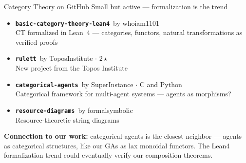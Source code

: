 \documentclass[aspectratio=169,14pt]{beamer}
\newcommand{\repo}[2]{\texttt{\color{geccoAccent}\bfseries #1}{\color{dimGray}\scriptsize\ by #2}}
\newcommand{\repoHL}[2]{\texttt{\color{geccoHighlight}\bfseries #1}{\color{dimGray}\scriptsize\ by #2}}
\newcommand{\repoGR}[2]{\texttt{\color{geccoGreen}\bfseries #1}{\color{dimGray}\scriptsize\ by #2}}
\newcommand{\bscore}[1]{{\color{geccoAccent}\bfseries #1}}
\newcommand{\connection}[1]{%
  \vspace{4pt}
  {\small\color{geccoHighlight}\textbf{Connection to our work:} \color{white}#1}}
\begin{document}
\begin{frame}{Category Theory on GitHub}
  {\small\color{dimGray} Small but active --- formalization is the trend}
  \vspace{6pt}

  \begin{itemize}
    \item[\bscore{0.20}] \repo{basic-category-theory-lean4}{whoiam1101}\\
      {\small CT formalized in Lean~4 --- categories, functors, natural transformations as verified proofs}
    \vspace{4pt}
    \item[] \repoGR{rulett}{ToposInstitute} {\small$\cdot$ 2\,\(\star\)}\\
      {\small New project from the Topos Institute}
    \vspace{4pt}
    \item[] \repoHL{categorical-agents}{SuperInstance} {\small$\cdot$ C and Python}\\
      {\small Categorical framework for multi-agent systems --- agents as morphisms?}
    \vspace{4pt}
    \item[] \repo{resource-diagrams}{formalsymbolic}\\
      {\small Resource-theoretic string diagrams}
  \end{itemize}

  \connection{categorical-agents is the closest neighbor --- agents as categorical structures, like our GAs as lax monoidal functors. The Lean4 formalization trend could eventually verify our composition theorems.}
\end{frame}
\end{document}
